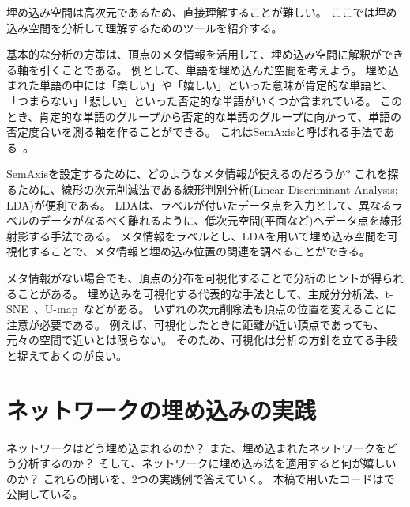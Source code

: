 \documentclass[J]{scitrans}
\begin{document}
埋め込み空間は高次元であるため、直接理解することが難しい。
ここでは埋め込み空間を分析して理解するためのツールを紹介する。

基本的な分析の方策は、頂点のメタ情報を活用して、埋め込み空間に解釈ができる軸を引くことである。
例として、単語を埋め込んだ空間を考えよう。
埋め込まれた単語の中には「楽しい」や「嬉しい」といった意味が肯定的な単語と、「つまらない」「悲しい」といった否定的な単語がいくつか含まれている。
このとき、肯定的な単語のグループから否定的な単語のグループに向かって、単語の否定度合いを測る軸を作ることができる。
これはSemAxisと呼ばれる手法である~\cite{An2018}。

SemAxisを設定するために、どのようなメタ情報が使えるのだろうか?
これを探るために、線形の次元削減法である線形判別分析(Linear Discriminant Analysis; LDA)が便利である。
LDAは、ラベルが付いたデータ点を入力として、異なるラベルのデータがなるべく離れるように、低次元空間(平面など)へデータ点を線形射影する手法である。
メタ情報をラベルとし、LDAを用いて埋め込み空間を可視化することで、メタ情報と埋め込み位置の関連を調べることができる。

メタ情報がない場合でも、頂点の分布を可視化することで分析のヒントが得られることがある。
埋め込みを可視化する代表的な手法として、主成分分析法、t-SNE~\cite{Maaten2008}、U-map~\cite{McInnes2018}などがある。
いずれの次元削除法も頂点の位置を変えることに注意が必要である。
例えば、可視化したときに距離が近い頂点であっても、元々の空間で近いとは限らない。
そのため、可視化は分析の方針を立てる手段と捉えておくのが良い。



\section{ネットワークの埋め込みの実践}

ネットワークはどう埋め込まれるのか？
また、埋め込まれたネットワークをどう分析するのか？
そして、ネットワークに埋め込み法を適用すると何が嬉しいのか？
これらの問いを、2つの実践例で答えていく。
本稿で用いたコードは\cite{code}で公開している。
\end{document}

